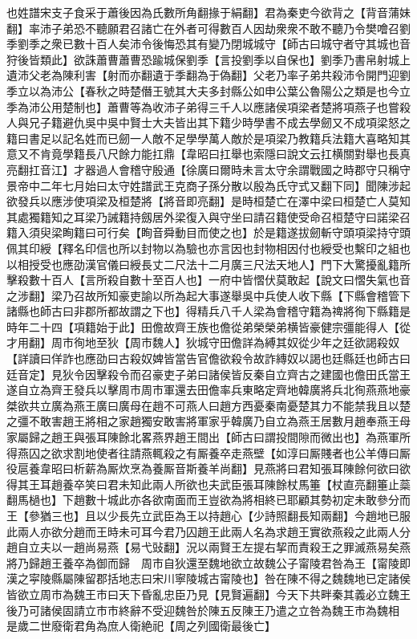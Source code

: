 也姓譜宋支子食采于蕭後因為氏數所角翻掾于絹翻】君為秦吏今欲背之【背音蒲妹翻】率沛子弟恐不聽願君召諸亡在外者可得數百人因劫衆衆不敢不聽乃令樊噲召劉季劉季之衆已數十百人矣沛令後悔恐其有變乃閉城城守【師古曰城守者守其城也音狩後皆類此】欲誅蕭曹蕭曹恐踰城保劉季【言投劉季以自保也】劉季乃書帛射城上遺沛父老為陳利害【射而亦翻遺于季翻為于偽翻】父老乃率子弟共殺沛令開門迎劉季立以為沛公【春秋之時楚僭王號其大夫多封縣公如申公葉公魯陽公之類是也今立季為沛公用楚制也】蕭曹等為收沛子弟得三千人以應諸侯項梁者楚將項燕子也嘗殺人與兄子籍避仇吳中吳中賢士大夫皆出其下籍少時學書不成去學劒又不成項梁怒之籍曰書足以記名姓而已劒一人敵不足學學萬人敵於是項梁乃教籍兵法籍大喜略知其意又不肯竟學籍長八尺餘力能扛鼎【韋昭曰扛舉也索隱曰說文云扛横關對舉也長真亮翻扛音江】才器過人會稽守殷通【徐廣曰爾時未言太守余謂戰國之時郡守只稱守景帝中二年七月始曰太守姓譜武王克商子孫分散以殷為氏守式又翻下同】聞陳涉起欲發兵以應涉使項梁及桓楚將【將音即亮翻】是時桓楚亡在澤中梁曰桓楚亡人莫知其處獨籍知之耳梁乃誡籍持劔居外梁復入與守坐曰請召籍使受命召桓楚守曰諾梁召籍入須臾梁眴籍曰可行矣【眴音舜動目而使之也】於是籍遂拔劒斬守頭項梁持守頭佩其印綬【釋名印信也所以封物以為驗也亦言因也封物相因付也綬受也繫印之組也以相授受也應劭漢官儀曰綬長丈二尺法十二月廣三尺法天地人】門下大驚擾亂籍所擊殺數十百人【言所殺自數十至百人也】一府中皆慴伏莫敢起【說文曰慴失氣也音之涉翻】梁乃召故所知豪吏諭以所為起大事遂舉吳中兵使人收下縣【下縣會稽管下諸縣也師古曰非郡所都故謂之下也】得精兵八千人梁為會稽守籍為禆將徇下縣籍是時年二十四【項籍始于此】田儋故齊王族也儋從弟榮榮弟横皆豪健宗彊能得人【從才用翻】周市徇地至狄【周市魏人】狄城守田儋詳為縛其奴從少年之廷欲謁殺奴【詳讀曰佯詐也應劭曰古殺奴婢皆當告官儋欲殺令故詐縳奴以謁也廷縣廷也師古曰廷音定】見狄令因擊殺令而召豪吏子弟曰諸侯皆反秦自立齊古之建國也儋田氏當王遂自立為齊王發兵以擊周市周市軍還去田儋率兵東略定齊地韓廣將兵北徇燕燕地豪桀欲共立廣為燕王廣曰廣母在趙不可燕人曰趙方西憂秦南憂楚其力不能禁我且以楚之彊不敢害趙王將相之家趙獨安敢害將軍家乎韓廣乃自立為燕王居數月趙奉燕王母家屬歸之趙王與張耳陳餘北畧燕界趙王間出【師古曰謂投間隙而微出也】為燕軍所得燕囚之欲求割地使者往請燕輒殺之有厮養卒走燕壁【如淳曰厮賤者也公羊傳曰厮役扈養韋昭曰析薪為厮炊烹為養厮音斯養羊尚翻】見燕將曰君知張耳陳餘何欲曰欲得其王耳趙養卒笑曰君未知此兩人所欲也夫武臣張耳陳餘杖馬箠【杖直亮翻箠止蘂翻馬檛也】下趙數十城此亦各欲南面而王豈欲為將相終已耶顧其勢初定未敢參分而王【參猶三也】且以少長先立武臣為王以持趙心【少詩照翻長知兩翻】今趙地已服此兩人亦欲分趙而王時未可耳今君乃囚趙王此兩人名為求趙王實欲燕殺之此兩人分趙自立夫以一趙尚易燕【易弋䜴翻】況以兩賢王左提右挈而責殺王之罪滅燕易矣燕將乃歸趙王養卒為御而歸　周市自狄還至魏地欲立故魏公子甯陵君咎為王【甯陵即漢之寜陵縣屬陳留郡括地志曰宋川寧陵城古甯陵也】咎在陳不得之魏魏地已定諸侯皆欲立周市為魏王市曰天下昏亂忠臣乃見【見賢遍翻】今天下共畔秦其義必立魏王後乃可諸侯固請立市市終辭不受迎魏咎於陳五反陳王乃遣之立咎為魏王市為魏相　是歲二世廢衛君角為庶人衛絶祀【周之列國衛最後亡】

